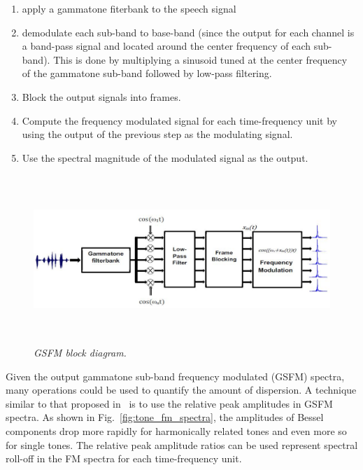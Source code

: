 {\begin{enumerate}
	\item apply a gammatone fiterbank to the speech signal
	\item demodulate each sub-band to base-band (since the output for each channel is a band-pass signal and located around the center frequency of each sub-band). 
	This is done by	multiplying a sinusoid tuned at the center frequency of	the gammatone sub-band followed by low-pass filtering.
	\item Block the output signals into frames. 
	\item Compute the frequency modulated signal for each time-frequency unit by using the output of the previous step as the modulating signal. 
	\item Use the spectral magnitude of the modulated signal as the output.
\end{enumerate}

\begin{figure}[t!]
	\centering
	\hspace{-1mm}
	\includegraphics[height = 2.5in, width=1\textwidth]{figures/gsfm_block_diagram}
	\vspace{-1mm}
	\caption{\it GSFM block diagram.}
	\vspace{0mm}
	\label{fig:gsfm_block_diagram}
\end{figure}

Given the output gammatone sub-band frequency modulated (GSFM) spectra, many operations could be used to quantify the amount of dispersion. 
A technique similar to that proposed in~\cite{sapvr_2000} is to use the relative peak amplitudes in GSFM spectra. 
As shown in Fig.~\ref{fig:tone_fm_spectra}, the amplitudes of Bessel components drop
more rapidly for harmonically related tones and even more so for single tones. 
The relative peak amplitude ratios can be used represent spectral roll-off in the FM spectra for each time-frequency unit. 

}
